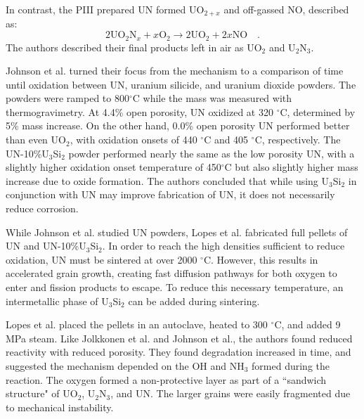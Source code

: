 \documentclass[11pt]{article}
\begin{document}
\begin{multicols}{2}
In contrast, the PIII prepared UN formed UO$_{2+x}$ and off-gassed NO, described as:
\begin{equation}
2\mbox{UO}_{2}\mbox{N}_{x} + x\mbox{O}_{2} \rightarrow 2 \mbox{UO}_{2} + 2x\mbox{NO} \quad .
\end{equation}
The authors described their final products left in air as UO$_{2}$ and U$_{2}$N$_{3}$.
\par 
Johnson et al. \cite{Johnson2016} turned their focus from the mechanism to a comparison of time until oxidation between UN, uranium silicide, and uranium dioxide powders. The powders were ramped to 800$^{\circ}$C while the mass was measured with thermogravimetry. At 4.4\% open porosity, UN oxidized at 320 $^{\circ}$C, determined by 5\% mass increase. On the other hand, 0.0\% open porosity UN performed better than even UO$_{2}$, with oxidation onsets of 440 $^{\circ}$C and 405 $^{\circ}$C, respectively. The UN-10\%U$_{3}$Si$_{2}$ powder performed nearly the same as the low porosity UN, with a slightly higher oxidation onset temperature of 450$^{\circ}$C but also slightly higher mass increase due to oxide formation. The authors concluded that while using U$_{3}$Si$_{2}$ in conjunction with UN may improve fabrication of UN, it does not necessarily reduce corrosion.
\par 
 While Johnson et al. studied UN powders, Lopes et al. \cite{Lopes2017}  fabricated full pellets of UN and UN-10\%U$_{3}$Si$_{2}$. In order to reach the high densities sufficient to reduce oxidation, UN must be sintered at over 2000 $^{\circ}$C. However, this results in accelerated grain growth, creating fast diffusion pathways for both oxygen to enter and fission products to escape. To reduce this necessary temperature, an intermetallic phase of U$_{3}$Si$_{2}$ can be added during sintering.
\par 
Lopes et al. placed the pellets in an autoclave, heated to 300 $^{\circ}$C, and added 9 MPa steam. Like Jolkkonen et al. and Johnson et al., the authors found reduced reactivity with reduced porosity. They found degradation increased in time, and suggested the mechanism depended on the OH and NH$_{3}$ formed during the reaction. The oxygen formed a non-protective layer as part of a ``sandwich structure" of UO$_{2}$, U$_{2}$N$_{3}$, and UN. The larger grains were easily fragmented due to mechanical instability.


\end{multicols}
\end{document}
